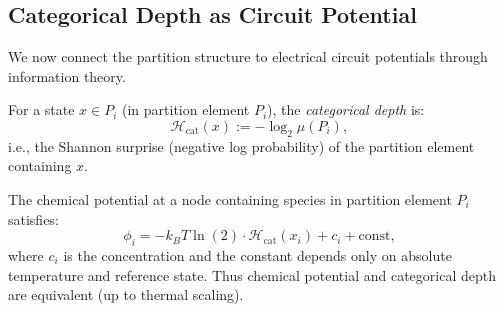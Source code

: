 \subsection{Categorical Depth as Circuit Potential}
\label{subsec:categorical-depth}

We now connect the partition structure to electrical circuit potentials through information theory.

\begin{definition}
\label{def:categorical-depth}
For a state $x \in P_i$ (in partition element $P_i$), the \emph{categorical depth} is:
\begin{equation}
  \mathcal{H}_{\text{cat}}(x) := -\log_2 \mu(P_i),
\end{equation}
i.e., the Shannon surprise (negative log probability) of the partition element containing $x$.
\end{definition}

\begin{theorem}
\label{thm:chem-potential-equals-depth}
The chemical potential at a node containing species in partition element $P_i$ satisfies:
\begin{equation}
  \phi_i = -k_B T \ln(2) \cdot \mathcal{H}_{\text{cat}}(x_i) + c_i + \text{const},
\end{equation}
where $c_i$ is the concentration and the constant depends only on absolute temperature and reference state. Thus chemical potential and categorical depth are equivalent (up to thermal scaling).
\end{theorem}

